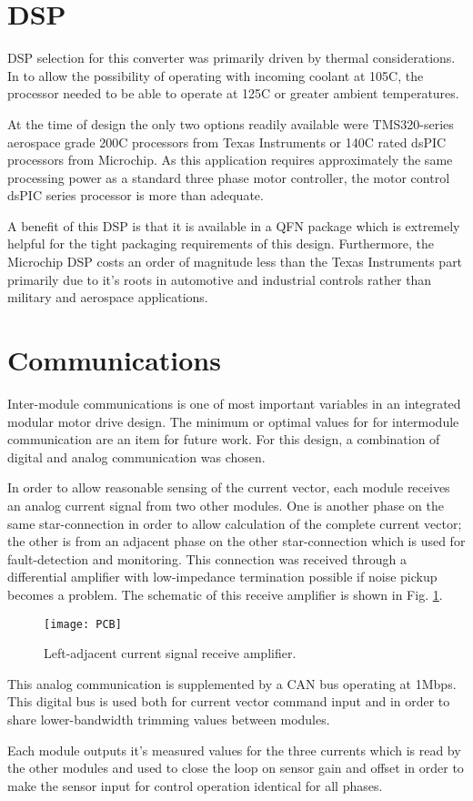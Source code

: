 \section{DSP}
DSP selection for this converter was primarily driven by thermal
considerations. In to allow the possibility of operating with incoming coolant
at 105C, the processor needed to be able to operate at 125C or greater ambient
temperatures.

At the time of design the only two options readily available were
TMS320-series aerospace grade 200C processors from Texas Instruments or 140C
rated dsPIC processors from Microchip. As this application requires
approximately the same processing power as a standard three phase motor
controller, the motor control dsPIC series processor is more than adequate.

A benefit of this DSP is that it is available in a QFN package which is
extremely helpful for the tight packaging requirements of this design.
Furthermore, the Microchip DSP costs an order of magnitude less than the Texas
Instruments part primarily due to it's roots in automotive and industrial
controls rather than military and aerospace applications.

\section{Communications}
Inter-module communications is one of most important variables in an
integrated modular motor drive design. The minimum or optimal values for
for intermodule communication are an item for future work. For this design, a
combination of digital and analog communication was chosen.

In order to allow reasonable sensing of the current vector, each module
receives an analog current signal from two other modules.  One is another
phase on the same star-connection in order to allow calculation of the
complete current vector; the other is from an adjacent phase on the other
star-connection which is used for fault-detection and monitoring.
This connection was received through a differential amplifier with
low-impedance termination possible if noise pickup becomes a problem.  The
schematic of this receive amplifier is shown in Fig. \ref{figRecAmp}.
\begin{figure}[htbp]
	\centering
	\label{figRecAmp}
	\texttt{[image: PCB]}
	\caption{Left-adjacent current signal receive amplifier.}
\end{figure}

This analog communication is supplemented by a CAN bus operating at 1Mbps.
This digital bus is used both for current vector command input and in order to
share lower-bandwidth trimming values between modules.

Each module outputs it's measured values for the three currents which is read
by the other modules and used to close the loop on sensor gain and offset in
order to make the sensor input for control operation identical for all phases.
